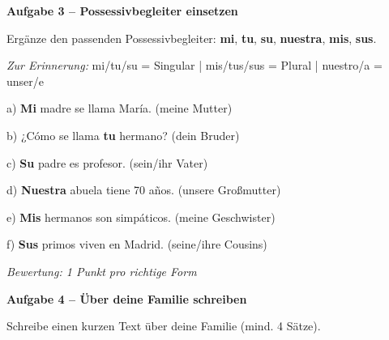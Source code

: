 \documentclass[11pt, a4paper]{article}
\newcommand{\fachfarbe}{spanisch}
\newcommand{\punktebox}[1]{\hfill\fbox{\small \_/#1}}
\newcommand{\loesung}[1]{\textcolor{loesung}{\textbf{#1}}}
\newenvironment{aufgabe}[1]{%
    \needspace{5\baselineskip}%
    \nopagebreak[4]%
    \vspace{10pt}
    \noindent\textbf{\textcolor{\fachfarbe}{Aufgabe #1}}
    \nopagebreak[4]%
    \vspace{5pt}
    \nopagebreak[4]%
    \begin{list}{}{\leftmargin=0pt}
    \item[]
}{%
    \end{list}
}
\newcommand{\es}[1]{\textcolor{\fachfarbe}{\textbf{#1}}}
\begin{document}
\vspace{15pt}


\begin{aufgabe}{3 -- Possessivbegleiter einsetzen}
Ergänze den passenden Possessivbegleiter: \es{mi}, \es{tu}, \es{su}, \es{nuestra}, \es{mis}, \es{sus}. \punktebox{6}
\end{aufgabe}

\begin{vokabelkasten}
\textit{Zur Erinnerung:} mi/tu/su = Singular | mis/tus/sus = Plural | nuestro/a = unser/e
\end{vokabelkasten}

\vspace{0.5em}

\noindent
a) \loesung{Mi} madre se llama María. \hfill (meine Mutter)

\vspace{0.8em}

\noindent
b) ¿Cómo se llama \loesung{tu} hermano? \hfill (dein Bruder)

\vspace{0.8em}

\noindent
c) \loesung{Su} padre es profesor. \hfill (sein/ihr Vater)

\vspace{0.8em}

\noindent
d) \loesung{Nuestra} abuela tiene 70 años. \hfill (unsere Großmutter)

\vspace{0.8em}

\noindent
e) \loesung{Mis} hermanos son simpáticos. \hfill (meine Geschwister)

\vspace{0.8em}

\noindent
f) \loesung{Sus} primos viven en Madrid. \hfill (seine/ihre Cousins)

\textit{\textcolor{grau}{Bewertung: 1 Punkt pro richtige Form}}

\vspace{15pt}


\begin{aufgabe}{4 -- Über deine Familie schreiben}
Schreibe einen kurzen Text über deine Familie (mind. 4 Sätze). \punktebox{6}
\end{aufgabe}
\end{document}
